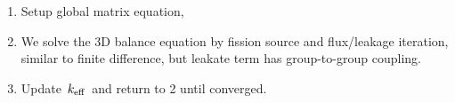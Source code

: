 \documentclass{school-22.211-notes}
\begin{document}
\begin{enumerate}
\item Setup global matrix equation,

\item We solve the 3D balance equation by fission source and flux/leakage iteration, similar to finite difference, but leakate term has group-to-group coupling. 
\item Update $\left. k_{\mathrm{eff}} \right.$ and return to 2 until converged. 
\end{enumerate}
\end{document}
